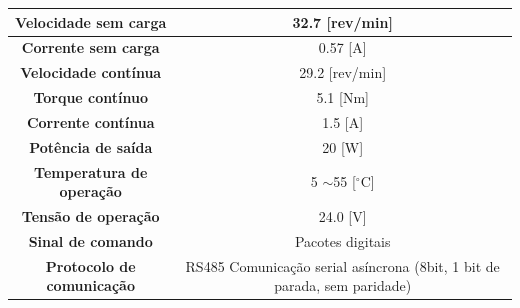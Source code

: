 \documentclass[
12pt,					%
openright,				%
twoside,				%
a4paper,				%
english,
brazil
]{ABNT/abntex2_report}
\begin{document}
\begin{table}[H]
\begin{adjustbox}{max width=\textwidth}
\begin{tabular}{|c|c|}
		\rowcolor[HTML]{EFEFEF} 
		{\color[HTML]{000000} \textbf{Velocidade sem carga}}                                        & {\color[HTML]{000000} 32.7 {[}rev/min{]}}                                                       \\ \hline
		\rowcolor[HTML]{FFFFFF} 
		{\color[HTML]{000000} \textbf{Corrente sem carga}}                                          & {\color[HTML]{000000} 0.57 {[}A{]}}                                                             \\ \hline
		\rowcolor[HTML]{EFEFEF} 
		{\color[HTML]{000000} \textbf{Velocidade contínua}}                                         & {\color[HTML]{000000} 29.2 {[}rev/min{]}}                                                       \\ \hline
		\rowcolor[HTML]{FFFFFF} 
		{\color[HTML]{000000} \textbf{Torque contínuo}}                                             & {\color[HTML]{000000} 5.1 {[}Nm{]}}                                                             \\ \hline
		\rowcolor[HTML]{EFEFEF} 
		{\color[HTML]{000000} \textbf{Corrente contínua}}                                           & {\color[HTML]{000000} 1.5 {[}A{]}}                                                              \\ \hline
		\rowcolor[HTML]{FFFFFF} 
		{\color[HTML]{000000} \textbf{Potência de saída}}                                           & {\color[HTML]{000000} 20 {[}W{]}}                                                               \\ \hline
		\rowcolor[HTML]{EFEFEF} 
		{\color[HTML]{000000} \textbf{Temperatura de operação}}                                     & {\color[HTML]{000000} 5 $\sim$55 {[}$^\circ$C{]}}                                               \\ \hline
		\rowcolor[HTML]{FFFFFF} 
		{\color[HTML]{000000} \textbf{Tensão de operação}}                                          & {\color[HTML]{000000} 24.0 {[}V{]}}                                                             \\ \hline
		\rowcolor[HTML]{EFEFEF} 
		{\color[HTML]{000000} \textbf{Sinal de comando}}                                            & {\color[HTML]{000000} Pacotes digitais}                                                         \\ \hline
		\rowcolor[HTML]{FFFFFF} 
		{\color[HTML]{000000} \textbf{Protocolo de comunicação}}                                    & {\color[HTML]{000000} RS485 Comunicação serial asíncrona (8bit, 1 bit de parada, sem paridade)} \\ \hline

\end{tabular}
\end{adjustbox}
\end{table}
\end{document}
